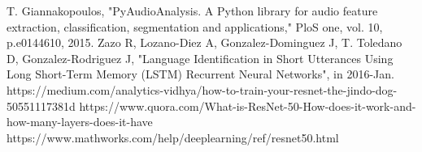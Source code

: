 \documentclass[conference]{IEEEtran}
\begin{document}
\begin{thebibliography}{00}
T. Giannakopoulos, "PyAudioAnalysis. A Python library for audio feature extraction, classification, segmentation and applications," PloS one, vol. 10, p.e0144610, 2015.
Zazo R, Lozano-Diez A, Gonzalez-Dominguez J, T. Toledano D, Gonzalez-Rodriguez J, "Language Identification in Short Utterances Using Long Short-Term Memory (LSTM) Recurrent Neural Networks", in 2016-Jan.
https://medium.com/analytics-vidhya/how-to-train-your-resnet-the-jindo-dog-50551117381d
https://www.quora.com/What-is-ResNet-50-How-does-it-work-and-how-many-layers-does-it-have
https://www.mathworks.com/help/deeplearning/ref/resnet50.html
\end{thebibliography}
\vspace{12pt}
\end{document}
